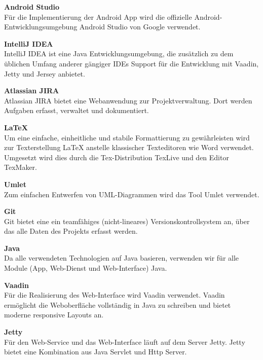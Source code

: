 \begin{description}
\item \textbf{Android Studio} \hfill \\
Für die Implementierung der Android App wird die offizielle Android-Entwicklungsumgebung Android Studio von Google verwendet.

\item \textbf{IntelliJ IDEA} \hfill \\
IntelliJ IDEA ist eine Java Entwicklungsumgebung, die zusätzlich zu dem üblichen Umfang anderer gängiger IDEs Support für die Entwicklung mit Vaadin, Jetty und Jersey anbietet.

\item \textbf{Atlassian JIRA} \hfill \\
Atlassian JIRA bietet eine Webanwendung zur Projektverwaltung. Dort werden Aufgaben erfasst, verwaltet und dokumentiert.

\item \textbf{LaTeX} \hfill \\
Um eine einfache, einheitliche und stabile Formattierung zu gewährleisten wird zur Texterstellung LaTeX  anstelle klassischer Texteditoren wie Word verwendet. Umgesetzt wird dies durch die Tex-Distribution TexLive und den Editor TexMaker.

\item \textbf{Umlet} \hfill \\
Zum einfachen Entwerfen von UML-Diagrammen wird das Tool Umlet verwendet.

\item \textbf{Git} \hfill \\
Git bietet eine ein teamfähiges (nicht-lineares) Versionskontrollsystem an, über das alle Daten des Projekts erfasst werden.

\item \textbf{Java} \hfill \\
Da alle verwendeten Technologien auf Java basieren, verwenden wir für alle Module (App, Web-Dienst und Web-Interface) Java.

\item \textbf{Vaadin} \hfill \\
Für die Realisierung des Web-Interface wird Vaadin verwendet. Vaadin ermöglicht die Weboberfläche vollständig in Java zu schreiben und bietet moderne responsive Layouts an.

\item \textbf{Jetty} \hfill \\
Für den Web-Service und das Web-Interface läuft auf dem Server Jetty. Jetty bietet eine Kombination aus Java Servlet und Http Server.


\end{description}
